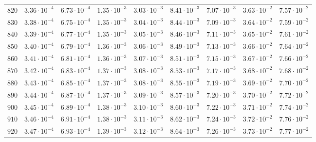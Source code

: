 \begin{landscape}
\begin{table}
\begin{tabular}{lcccccccc}
$	820	$ & $	3.36 \cdot 10^{-4}	$ & $	6.73 \cdot 10^{-4}	$ & $	1.35 \cdot 10^{-3}	$ & $	3.03 \cdot 10^{-3}	$ & $	8.41 \cdot 10^{-3}	$ & $	7.07 \cdot 10^{-3}	$ & $	3.63 \cdot 10^{-2}	$ & $	7.57 \cdot 10^{-2}	 $ \\
$	830	$ & $	3.38 \cdot 10^{-4}	$ & $	6.75 \cdot 10^{-4}	$ & $	1.35 \cdot 10^{-3}	$ & $	3.04 \cdot 10^{-3}	$ & $	8.44 \cdot 10^{-3}	$ & $	7.09 \cdot 10^{-3}	$ & $	3.64 \cdot 10^{-2}	$ & $	7.59 \cdot 10^{-2}	 $ \\
$	840	$ & $	3.39 \cdot 10^{-4}	$ & $	6.77 \cdot 10^{-4}	$ & $	1.35 \cdot 10^{-3}	$ & $	3.05 \cdot 10^{-3}	$ & $	8.46 \cdot 10^{-3}	$ & $	7.11 \cdot 10^{-3}	$ & $	3.65 \cdot 10^{-2}	$ & $	7.61 \cdot 10^{-2}	 $ \\
$	850	$ & $	3.40 \cdot 10^{-4}	$ & $	6.79 \cdot 10^{-4}	$ & $	1.36 \cdot 10^{-3}	$ & $	3.06 \cdot 10^{-3}	$ & $	8.49 \cdot 10^{-3}	$ & $	7.13 \cdot 10^{-3}	$ & $	3.66 \cdot 10^{-2}	$ & $	7.64 \cdot 10^{-2}	 $ \\
$	860	$ & $	3.41 \cdot 10^{-4}	$ & $	6.81 \cdot 10^{-4}	$ & $	1.36 \cdot 10^{-3}	$ & $	3.07 \cdot 10^{-3}	$ & $	8.51 \cdot 10^{-3}	$ & $	7.15 \cdot 10^{-3}	$ & $	3.67 \cdot 10^{-2}	$ & $	7.66 \cdot 10^{-2}	 $ \\
$	870	$ & $	3.42 \cdot 10^{-4}	$ & $	6.83 \cdot 10^{-4}	$ & $	1.37 \cdot 10^{-3}	$ & $	3.08 \cdot 10^{-3}	$ & $	8.53 \cdot 10^{-3}	$ & $	7.17 \cdot 10^{-3}	$ & $	3.68 \cdot 10^{-2}	$ & $	7.68 \cdot 10^{-2}	 $ \\
$	880	$ & $	3.43 \cdot 10^{-4}	$ & $	6.85 \cdot 10^{-4}	$ & $	1.37 \cdot 10^{-3}	$ & $	3.08 \cdot 10^{-3}	$ & $	8.55 \cdot 10^{-3}	$ & $	7.19 \cdot 10^{-3}	$ & $	3.69 \cdot 10^{-2}	$ & $	7.70 \cdot 10^{-2}	 $ \\
$	890	$ & $	3.44 \cdot 10^{-4}	$ & $	6.87 \cdot 10^{-4}	$ & $	1.37 \cdot 10^{-3}	$ & $	3.09 \cdot 10^{-3}	$ & $	8.57 \cdot 10^{-3}	$ & $	7.20 \cdot 10^{-3}	$ & $	3.70 \cdot 10^{-2}	$ & $	7.72 \cdot 10^{-2}	 $ \\
$	900	$ & $	3.45 \cdot 10^{-4}	$ & $	6.89 \cdot 10^{-4}	$ & $	1.38 \cdot 10^{-3}	$ & $	3.10 \cdot 10^{-3}	$ & $	8.60 \cdot 10^{-3}	$ & $	7.22 \cdot 10^{-3}	$ & $	3.71 \cdot 10^{-2}	$ & $	7.74 \cdot 10^{-2}	 $ \\
$	910	$ & $	3.46 \cdot 10^{-4}	$ & $	6.91 \cdot 10^{-4}	$ & $	1.38 \cdot 10^{-3}	$ & $	3.11 \cdot 10^{-3}	$ & $	8.62 \cdot 10^{-3}	$ & $	7.24 \cdot 10^{-3}	$ & $	3.72 \cdot 10^{-2}	$ & $	7.76 \cdot 10^{-2}	 $ \\
$	920	$ & $	3.47 \cdot 10^{-4}	$ & $	6.93 \cdot 10^{-4}	$ & $	1.39 \cdot 10^{-3}	$ & $	3.12 \cdot 10^{-3}	$ & $	8.64 \cdot 10^{-3}	$ & $	7.26 \cdot 10^{-3}	$ & $	3.73 \cdot 10^{-2}	$ & $	7.77 \cdot 10^{-2}	 $ \\

\end{tabular}
\end{table}
\end{landscape}
